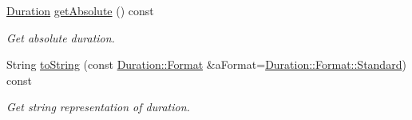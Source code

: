 \begin{DoxyCompactItemize}
\hyperlink{classlibrary_1_1physics_1_1time_1_1_duration}{Duration} \hyperlink{classlibrary_1_1physics_1_1time_1_1_duration_afbe401469b6b6356439d6f7c5b21e67e}{get\+Absolute} () const
\begin{DoxyCompactList}\small\item\em Get absolute duration. \end{DoxyCompactList}\item 
String \hyperlink{classlibrary_1_1physics_1_1time_1_1_duration_a06f24e6cc8cb867abbae969c5f199513}{to\+String} (const \hyperlink{classlibrary_1_1physics_1_1time_1_1_duration_ace85659cafe97df992c0e4273bdc88d1}{Duration\+::\+Format} \&a\+Format=\hyperlink{classlibrary_1_1physics_1_1time_1_1_duration_ace85659cafe97df992c0e4273bdc88d1aeb6d8ae6f20283755b339c0dc273988b}{Duration\+::\+Format\+::\+Standard}) const
\begin{DoxyCompactList}\small\item\em Get string representation of duration. \end{DoxyCompactList}\end{DoxyCompactItemize}
